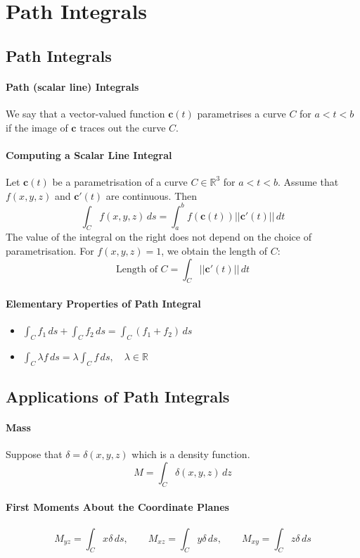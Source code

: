 
\section{Path Integrals}
\subsection{Path Integrals}
\paragraph{Path (scalar line) Integrals}
We say that a vector-valued function \(\textbf{c}(t)\) parametrises a curve \(C\) for \(a < t < b\) if the image of \(\textbf{c}\) traces out the curve \(C\). 

\paragraph{Computing a Scalar Line Integral}
Let \(\textbf{c}(t)\) be a parametrisation of a curve \(C \in \mathbb R^3\) for \(a < t < b\). Assume that \(f(x,y,z)\) and \(\textbf{c}'(t)\) are continuous. Then 
\[\int_C f(x,y,z) \, ds = \int_a^b f(\textbf{c}(t))||\textbf{c}'(t)|| \, dt \]
The value of the integral on the right does not depend on the choice of parametrisation. For \(f(x,y,z) = 1\), we obtain the length of \(C\):
\[\text{Length of } C = \int_C ||\textbf{c}'(t)|| \, dt\]

\paragraph{Elementary Properties of Path Integral}
\begin{itemize}
    \item \(\int_C f_1 \, ds + \int_C f_2 \, ds = \int_C (f_1 + f_2) \, ds\)
    \item \(\int_C \lambda f \, ds = \lambda \int_C f \, ds, \quad \lambda \in \mathbb R\)
\end{itemize}

\subsection{Applications of Path Integrals}
\paragraph{Mass}
Suppose that \(\delta = \delta(x,y,z)\) which is a density function.
\[M = \int_C \delta(x,y,z) \, dz\]
\paragraph{First Moments About the Coordinate Planes}
\[M_{yz} = \int_C x \delta \, ds, \qquad M_{xz} = \int_C y\delta \, ds, \qquad M_{xy} = \int_C z\delta \, ds\]
